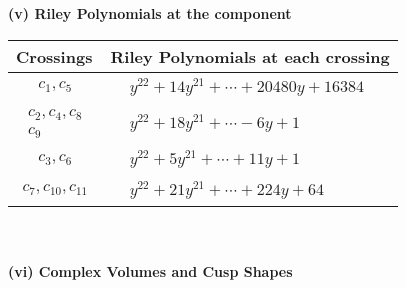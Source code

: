 \documentclass[1p]{elsarticle_modified}
\theoremstyle{definition}
\begin{document}
\newpage\renewcommand{\arraystretch}{1}
\flushleft \textbf{(v) Riley Polynomials at the component}\newline \\
\begin{tabular}{m{50pt}|m{274pt}}
Crossings & \hspace{64pt}Riley Polynomials at each crossing \\
\hline $$\begin{aligned}c_{1},c_{5}\end{aligned}$$&$\begin{aligned}
&y^{22}+14 y^{21}+\cdots+20480 y+16384
\end{aligned}$\\
\hline $$\begin{aligned}c_{2},c_{4},c_{8}\\c_{9}\end{aligned}$$&$\begin{aligned}
&y^{22}+18 y^{21}+\cdots-6 y+1
\end{aligned}$\\
\hline $$\begin{aligned}c_{3},c_{6}\end{aligned}$$&$\begin{aligned}
&y^{22}+5 y^{21}+\cdots+11 y+1
\end{aligned}$\\
\hline $$\begin{aligned}c_{7},c_{10},c_{11}\end{aligned}$$&$\begin{aligned}
&y^{22}+21 y^{21}+\cdots+224 y+64
\end{aligned}$\\
\hline
\end{tabular}\\~\\
\newpage\flushleft \textbf{(vi) Complex Volumes and Cusp Shapes}
\end{document}

